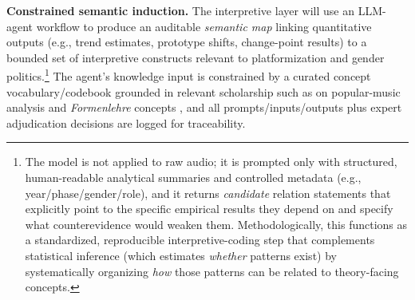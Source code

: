 \documentclass[11pt]{article}
\begin{document}
\textbf{Constrained semantic induction.}
The interpretive layer will use an LLM-agent workflow to produce an auditable \emph{semantic map} linking quantitative outputs (e.g., trend estimates, prototype shifts, change-point results) to a bounded set of interpretive constructs relevant to platformization and gender politics.\footnote{The model is not applied to raw audio; it is prompted only with structured, human-readable analytical summaries and controlled metadata (e.g., year/phase/gender/role), and it returns \emph{candidate} relation statements that explicitly point to the specific empirical results they depend on and specify what counterevidence would weaken them. Methodologically, this functions as a standardized, reproducible interpretive-coding step that complements statistical inference (which estimates \emph{whether} patterns exist) by systematically organizing \emph{how} those patterns can be related to theory-facing concepts.} The agent’s knowledge input is constrained by a curated concept vocabulary/codebook grounded in relevant scholarship such as on popular-music analysis and \textit{Formenlehre} concepts \citep{covach2005form,nobile2020,caplin1998,Schmalfeldt2009Process,VandeMoortele2015Formal}, and all prompts/inputs/outputs plus expert adjudication decisions are logged for traceability.
\end{document}
